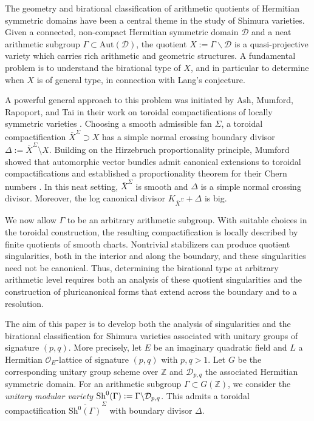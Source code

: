 \documentclass[11pt]{amsart}
\theoremstyle{plain}
\theoremstyle{definition}
\numberwithin{equation}{section}
\def\OO{\mathscr{O}}
\newcommand{\bbZ}{\mathbb{Z}}
\newcommand{\defeq}{\vcentcolon=}
\begin{document}
The geometry and birational classification of arithmetic quotients of Hermitian symmetric domains
have been a central theme in the study of Shimura varieties.
Given a connected, non-compact Hermitian symmetric domain $\mathcal{D}$ and a neat arithmetic subgroup
$\Gamma \subset \mathrm{Aut}(\mathcal{D})$, the quotient $X := \Gamma \backslash \mathcal{D}$
is a quasi-projective variety which carries rich arithmetic and geometric structures.
A fundamental problem is to understand the birational type of $X$, and in particular
to determine when $X$ is of general type, in connection with Lang's conjecture.

A powerful general approach to this problem was initiated by Ash, Mumford, Rapoport, and Tai in their work
on toroidal compactifications of locally symmetric varieties \cite{ash2010smooth}.
Choosing a smooth admissible fan $\Sigma$, a toroidal compactification $\overline{X}^{\Sigma} \supset X$ has a simple normal crossing boundary divisor $\Delta := \overline{X}^{\Sigma} \setminus X$.
Building on the Hirzebruch proportionality principle, Mumford showed that
automorphic vector bundles admit canonical extensions to toroidal
compactifications and established a proportionality theorem for their
Chern numbers  \cite{mumford1977hirzebruch}.
In this neat setting, $\overline{X}^{\Sigma}$ is smooth
and $\Delta$ is a simple normal crossing divisor.
Moreover, the log canonical divisor
$K_{\overline{X}^{\Sigma}}+\Delta$ is big.

We now allow $\Gamma$ to be an arbitrary arithmetic
subgroup.
With suitable choices in the toroidal construction,
the resulting compactification is locally described
by finite quotients of smooth charts.
Nontrivial stabilizers can produce quotient singularities,
both in the interior and along the boundary,
and these singularities need not be canonical.
Thus, determining the birational type at arbitrary
arithmetic level requires both an analysis of these
quotient singularities and the construction of
pluricanonical forms that extend across the boundary
and to a resolution.

The aim of this paper is to develop both the analysis of  singularities and the birational classification for Shimura varieties associated with unitary groups of signature $(p,q)$.
More precisely, let $E$ be an imaginary quadratic field and $L$ a Hermitian $\OO_E$-lattice of signature $(p,q)$ with $p,q>1$.
Let $G$ be the corresponding unitary group scheme over $\bbZ$ and $\mathcal{D}_{p,q}$ the associated Hermitian symmetric domain.
For an arithmetic subgroup $\Gamma \subset G(\bbZ)$, we consider the
\emph{unitary modular variety} $\mathrm{Sh}^0(\Gamma) \defeq \Gamma\backslash \mathcal{D}_{p,q}$.
This admits a toroidal compactification $\overline{\mathrm{Sh}^0(\Gamma)}^{\Sigma}$ with boundary divisor $\Delta$.
\end{document}
